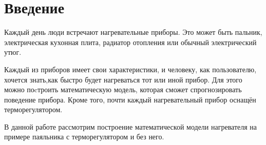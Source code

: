 \section{Введение}

Каждый день люди встречают нагревательные приборы. Это может быть пальник, электрическая кухонная плита, радиатор отопления или обычный электрический утюг.

Каждый из приборов имеет свои характеристики, и человеку, как пользователю, хочется знать,как быстро будет нагреваться тот или иной прибор. Для этого можно поcтроить математическую модель, которая сможет спрогнозировать поведение прибора. Кроме того, почти каждый нагревательный прибор оснащён терморегулятором.

В данной работе рассмотрим построение математической модели нагревателя на примере паяльника с терморегулятором и без него.